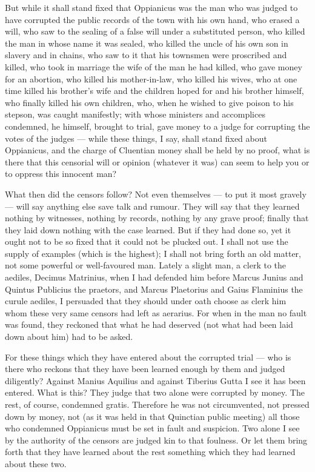  But while it shall stand fixed that Oppianicus was the man who was judged to have corrupted the public records of the town with his own hand, who erased a will, who saw to the sealing of a false will under a substituted person, who killed the man in whose name it was sealed, who killed the uncle of his own son in slavery and in chains, who saw to it that his townsmen were proscribed and killed, who took in marriage the wife of the man he had killed, who gave money for an abortion, who killed his mother-in-law, who killed his wives, who at one time killed his brother's wife and the children hoped for and his brother himself, who finally killed his own children, who, when he wished to give poison to his stepson, was caught manifestly; with whose ministers and accomplices condemned, he himself, brought to trial, gave money to a judge for corrupting the votes of the judges --- while these things, I say, shall stand fixed about Oppianicus, and the charge of Cluentian money shall be held by no proof, what is there that this censorial will or opinion (whatever it was) can seem to help you or to oppress this innocent man?

 What then did the censors follow? Not even themselves --- to put it most gravely --- will say anything else save talk and rumour. They will say that they learned nothing by witnesses, nothing by records, nothing by any grave proof; finally that they laid down nothing with the case learned. But if they had done so, yet it ought not to be so fixed that it could not be plucked out. I shall not use the supply of examples (which is the highest); I shall not bring forth an old matter, not some powerful or well-favoured man. Lately a slight man, a clerk to the aediles, Decimus Matrinius, when I had defended him before Marcus Junius and Quintus Publicius the praetors, and Marcus Plaetorius and Gaius Flaminius the curule aediles, I persuaded that they should under oath choose as clerk him whom these very same censors had left as aerarius. For when in the man no fault was found, they reckoned that what he had deserved (not what had been laid down about him) had to be asked.

 For these things which they have entered about the corrupted trial --- who is there who reckons that they have been learned enough by them and judged diligently? Against Manius Aquilius and against Tiberius Gutta I see it has been entered. What is this? They judge that two alone were corrupted by money. The rest, of course, condemned gratis. Therefore he was not circumvented, not pressed down by money, not (as it was held in that Quinctian public meeting) all those who condemned Oppianicus must be set in fault and suspicion. Two alone I see by the authority of the censors are judged kin to that foulness. Or let them bring forth that they have learned about the rest something which they had learned about these two.

